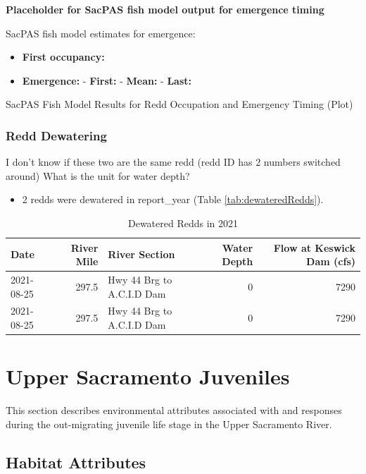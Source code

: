 \documentclass[
]{book}
\providecommand{\tightlist}{%
  \setlength{\itemsep}{0pt}\setlength{\parskip}{0pt}}
\theoremstyle{definition}
\theoremstyle{definition}
\theoremstyle{definition}
\theoremstyle{definition}
\theoremstyle{remark}
\begin{document}
\textbf{Placeholder for SacPAS fish model output for emergence timing}

SacPAS fish model estimates for emergence:

\begin{itemize}
\tightlist
\item
  \textbf{First occupancy:}
\item
  \textbf{Emergence:}
  - \textbf{First:}
  - \textbf{Mean:}
  - \textbf{Last:}
\end{itemize}

SacPAS Fish Model Results for Redd Occupation and Emergency Timing (Plot)

\hypertarget{redd-dewatering}{%
\subsection{Redd Dewatering}\label{redd-dewatering}}

I don't know if these two are the same redd (redd ID has 2 numbers switched around)
What is the unit for water depth?

\begin{itemize}
\tightlist
\item
  2 redds were dewatered in report\_year (Table \ref{tab:dewateredRedds}).
\end{itemize}

\begin{table}
\centering
\caption{Dewatered Redds in 2021}
\centering
\begin{tabular}[t]{lrlrr}
\hline
Date & River Mile & River Section & Water Depth & Flow at Keswick Dam (cfs)\\
\hline
2021-08-25 & 297.5 & Hwy 44 Brg to A.C.I.D Dam & 0 & 7290\\
\hline
2021-08-25 & 297.5 & Hwy 44 Brg to A.C.I.D Dam & 0 & 7290\\
\hline
\end{tabular}
\end{table}

\hypertarget{upper-sacramento-juveniles}{%
\chapter{Upper Sacramento Juveniles}\label{upper-sacramento-juveniles}}

This section describes environmental attributes associated with and responses during the out-migrating juvenile life stage in the Upper Sacramento River.

\hypertarget{habitat-attributes-1}{%
\section{Habitat Attributes}\label{habitat-attributes-1}}
\end{document}
